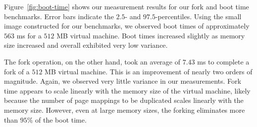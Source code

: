 \begin{figure*}[h]
  \center

  \label{fig:fork-time}
  \hspace{1cm}
  \caption{Time for virtual machine cold start vs. fork}
  \label{fig:boot-time}
\end{figure*}

 Figure~\ref{fig:boot-time} shows our measurement results
for our fork and boot time benchmarks. Error bars indicate the $2.5$- and
$97.5$-percentiles. Using the small image constructed for our benchmarks, we
observed boot times of approximately $563$ ms for a $512$ MB virtual machine.
Boot times increased slightly as memory size increased and overall exhibited
very low variance.

The fork operation, on the other hand, took an average of $7.43$ ms to complete
a fork of a $512$ MB virtual machine. This is an improvement of nearly two
orders of magnitude. Again, we observed very little variance in our
measurements. Fork time appears to scale linearly with the memory size of the
virtual machine, likely because the number of page mappings to be duplicated
scales linearly with the memory size. However, even at large memory sizes, the
forking eliminates more than $95$\% of the boot time.

